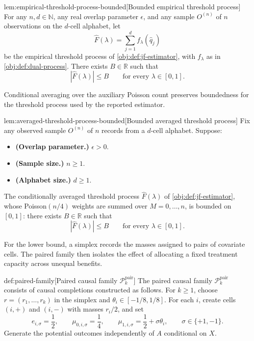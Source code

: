\begin{lemmav}{lem:empirical-threshold-process-bounded}[Bounded empirical threshold process]
For any \(n,d\in\mathbb N\), any real overlap parameter \(\epsilon\), and any sample \(O^{(n)}\) of \(n\) observations on the \(d\)-cell alphabet, let
\[
\widehat F(\lambda)=\sum_{j=1}^{d}f_\lambda(\widehat q_j)
\]
be the empirical threshold process of \cref{obj:def:jf-estimator}, with \(f_\lambda\) as in \cref{obj:def:dual-process}. There exists \(B\in\mathbb R\) such that
\[
|\widehat F(\lambda)|\leq B
\qquad\text{for every }\lambda\in[0,1].
\]
\end{lemmav}

Conditional averaging over the auxiliary Poisson count preserves boundedness for the threshold process used by the reported estimator.

\begin{lemmav}{lem:averaged-threshold-process-bounded}[Bounded averaged threshold process]
Fix any observed sample \(O^{(n)}\) of \(n\) records from a \(d\)-cell alphabet. Suppose:
\begin{itemize}
\item \textbf{(Overlap parameter.)} \(\epsilon>0\).
\item \textbf{(Sample size.)} \(n\geq 1\).
\item \textbf{(Alphabet size.)} \(d\geq 1\).
\end{itemize}
The conditionally averaged threshold process \(\widehat F(\lambda)\) of \cref{obj:def:jf-estimator}, whose Poisson\((n/4)\) weights are summed over \(M=0,\ldots,n\), is bounded on \([0,1]\): there exists \(B\in\mathbb R\) such that
\[
|\widehat F(\lambda)|\leq B
\qquad\text{for every }\lambda\in[0,1].
\]
\end{lemmav}

For the lower bound, a simplex records the masses assigned to pairs of covariate cells. The paired family then isolates the effect of allocating a fixed treatment capacity across unequal benefits.

\begin{definitionv}{def:paired-family}[Paired causal family $\mathcal P_k^{\mathrm{pair}}$]
The paired causal family \(\mathcal P_k^{\mathrm{pair}}\) consists of causal completions constructed as follows. For \(k\geq1\), choose \(r=(r_1,\ldots,r_k)\) in the simplex and \(\theta_i\in[-1/8,1/8]\). For each \(i\), create cells \((i,+)\) and \((i,-)\) with masses \(r_i/2\), and set
\[
e_{i,\sigma}=\frac12,\qquad
\mu_{0,i,\sigma}=\frac14,\qquad
\mu_{1,i,\sigma}=\frac12+\sigma\theta_i,
\qquad
\sigma\in\{+1,-1\}.
\]
Generate the potential outcomes independently of \(A\) conditional on \(X\).
\end{definitionv}

